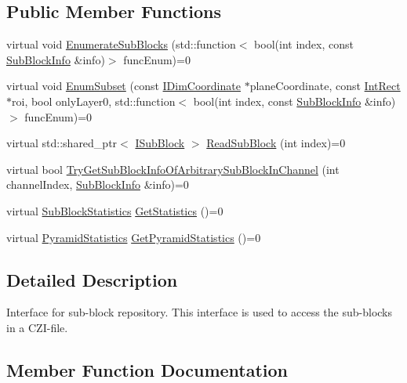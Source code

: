 \subsection*{Public Member Functions}
\begin{DoxyCompactItemize}
\item 
virtual void \hyperlink{classlib_c_z_i_1_1_i_sub_block_repository_a986ec9360cafdbadafdea9b8b5528ac3}{Enumerate\+Sub\+Blocks} (std\+::function$<$ bool(int index, const \hyperlink{structlib_c_z_i_1_1_sub_block_info}{Sub\+Block\+Info} \&info)$>$ func\+Enum)=0
\item 
virtual void \hyperlink{classlib_c_z_i_1_1_i_sub_block_repository_abf5c6fe4c21dde7079ac9c5aa04a760f}{Enum\+Subset} (const \hyperlink{classlib_c_z_i_1_1_i_dim_coordinate}{I\+Dim\+Coordinate} $\ast$plane\+Coordinate, const \hyperlink{structlib_c_z_i_1_1_int_rect}{Int\+Rect} $\ast$roi, bool only\+Layer0, std\+::function$<$ bool(int index, const \hyperlink{structlib_c_z_i_1_1_sub_block_info}{Sub\+Block\+Info} \&info)$>$ func\+Enum)=0
\item 
virtual std\+::shared\+\_\+ptr$<$ \hyperlink{classlib_c_z_i_1_1_i_sub_block}{I\+Sub\+Block} $>$ \hyperlink{classlib_c_z_i_1_1_i_sub_block_repository_afd2d9c375554492cf499c97ae49aa50b}{Read\+Sub\+Block} (int index)=0
\item 
virtual bool \hyperlink{classlib_c_z_i_1_1_i_sub_block_repository_ae557269ff1dcc03bacc21610b17d2104}{Try\+Get\+Sub\+Block\+Info\+Of\+Arbitrary\+Sub\+Block\+In\+Channel} (int channel\+Index, \hyperlink{structlib_c_z_i_1_1_sub_block_info}{Sub\+Block\+Info} \&info)=0
\item 
virtual \hyperlink{structlib_c_z_i_1_1_sub_block_statistics}{Sub\+Block\+Statistics} \hyperlink{classlib_c_z_i_1_1_i_sub_block_repository_a6e44c1a929a27036ef77195d516dd719}{Get\+Statistics} ()=0
\item 
virtual \hyperlink{structlib_c_z_i_1_1_pyramid_statistics}{Pyramid\+Statistics} \hyperlink{classlib_c_z_i_1_1_i_sub_block_repository_ab2ce65ddad39daae9ec51ea17f6fbbcf}{Get\+Pyramid\+Statistics} ()=0
\end{DoxyCompactItemize}


\subsection{Detailed Description}
Interface for sub-\/block repository. This interface is used to access the sub-\/blocks in a C\+Z\+I-\/file. 

\subsection{Member Function Documentation}
\mbox{\label{classlib_c_z_i_1_1_i_sub_block_repository_a986ec9360cafdbadafdea9b8b5528ac3}} 
